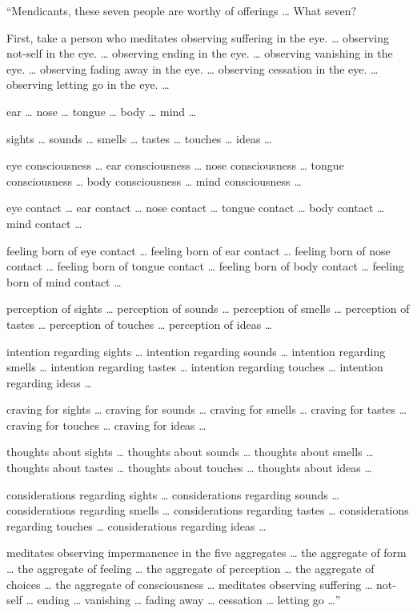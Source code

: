 \documentclass[12pt,openany]{book}%
\begin{document}
“Mendicants, these seven people are worthy of offerings … What seven? 

First, take a person who meditates observing suffering in the eye. … observing not-self in the eye. … observing ending in the eye. … observing vanishing in the eye. … observing fading away in the eye. … observing cessation in the eye. … observing letting go in the eye. … 

ear … nose … tongue … body … mind … 

sights … sounds … smells … tastes … touches … ideas … 

eye consciousness … ear consciousness … nose consciousness … tongue consciousness … body consciousness … mind consciousness … 

eye contact … ear contact … nose contact … tongue contact … body contact … mind contact … 

feeling born of eye contact … feeling born of ear contact … feeling born of nose contact … feeling born of tongue contact … feeling born of body contact … feeling born of mind contact … 

perception of sights … perception of sounds … perception of smells … perception of tastes … perception of touches … perception of ideas … 

intention regarding sights … intention regarding sounds … intention regarding smells … intention regarding tastes … intention regarding touches … intention regarding ideas … 

craving for sights … craving for sounds … craving for smells … craving for tastes … craving for touches … craving for ideas … 

thoughts about sights … thoughts about sounds … thoughts about smells … thoughts about tastes … thoughts about touches … thoughts about ideas … 

considerations regarding sights … considerations regarding sounds … considerations regarding smells … considerations regarding tastes … considerations regarding touches … considerations regarding ideas … 

meditates observing impermanence in the five aggregates … the aggregate of form … the aggregate of feeling … the aggregate of perception … the aggregate of choices … the aggregate of consciousness … meditates observing suffering … not-self … ending … vanishing … fading away … cessation … letting go …” 
\end{document}
